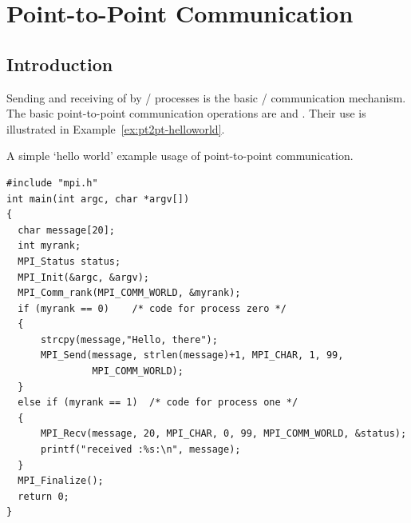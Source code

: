 \chapter{Point-to-Point Communication}
\label{sec:pt2pt}
\label{chap:pt2pt}

\section{Introduction}
\label{sec:pt2pt-intro}

Sending and receiving of  by \MPI/ processes is the basic \MPI/
communication mechanism.
The basic point-to-point communication operations are  and
.  Their use is illustrated in Example~\ref{ex:pt2pt-helloworld}.

\begin{example}
\label{ex:pt2pt-helloworld}
%
%
A simple `hello world' example usage of point-to-point communication.

\begin{lstlisting}[language={[MPI]C}]
#include "mpi.h"
int main(int argc, char *argv[])
{
  char message[20];
  int myrank;
  MPI_Status status;
  MPI_Init(&argc, &argv);
  MPI_Comm_rank(MPI_COMM_WORLD, &myrank);
  if (myrank == 0)    /* code for process zero */
  {
      strcpy(message,"Hello, there");
      MPI_Send(message, strlen(message)+1, MPI_CHAR, 1, 99,
               MPI_COMM_WORLD);
  }
  else if (myrank == 1)  /* code for process one */
  {
      MPI_Recv(message, 20, MPI_CHAR, 0, 99, MPI_COMM_WORLD, &status);
      printf("received :%s:\n", message);
  }
  MPI_Finalize();
  return 0;
}
\end{lstlisting}
\end{example}

